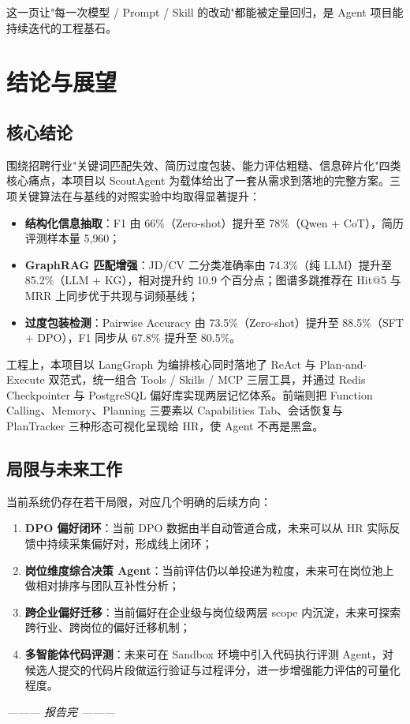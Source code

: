 \documentclass[12pt,a4paper]{ctexart}
\begin{document}
这一页让"每一次模型 / Prompt / Skill 的改动"都能被定量回归，是 Agent 项目能持续迭代的工程基石。

\section{结论与展望}\label{sec:conclusion}

\subsection{核心结论}

围绕招聘行业"关键词匹配失效、简历过度包装、能力评估粗糙、信息碎片化"四类核心痛点，本项目以 ScoutAgent 为载体给出了一套从需求到落地的完整方案。三项关键算法在与基线的对照实验中均取得显著提升：

\begin{itemize}[itemsep=2pt]
  \item \textbf{结构化信息抽取}：F1 由 66\%（Zero-shot）提升至 78\%（Qwen + CoT），简历评测样本量 5{,}960；
  \item \textbf{GraphRAG 匹配增强}：JD/CV 二分类准确率由 74.3\%（纯 LLM）提升至 85.2\%（LLM + KG），相对提升约 10.9 个百分点；图谱多跳推荐在 Hit@5 与 MRR 上同步优于共现与词频基线；
  \item \textbf{过度包装检测}：Pairwise Accuracy 由 73.5\%（Zero-shot）提升至 88.5\%（SFT + DPO），F1 同步从 67.8\% 提升至 80.5\%。
\end{itemize}

工程上，本项目以 LangGraph 为编排核心同时落地了 ReAct 与 Plan-and-Execute 双范式，统一组合 Tools / Skills / MCP 三层工具，并通过 Redis Checkpointer 与 PostgreSQL 偏好库实现两层记忆体系。前端则把 Function Calling、Memory、Planning 三要素以 Capabilities Tab、会话恢复与 PlanTracker 三种形态可视化呈现给 HR，使 Agent 不再是黑盒。

\subsection{局限与未来工作}

当前系统仍存在若干局限，对应几个明确的后续方向：

\begin{enumerate}[itemsep=3pt]
  \item \textbf{DPO 偏好闭环}：当前 DPO 数据由半自动管道合成，未来可以从 HR 实际反馈中持续采集偏好对，形成线上闭环；
  \item \textbf{岗位维度综合决策 Agent}：当前评估仍以单投递为粒度，未来可在岗位池上做相对排序与团队互补性分析；
  \item \textbf{跨企业偏好迁移}：当前偏好在企业级与岗位级两层 scope 内沉淀，未来可探索跨行业、跨岗位的偏好迁移机制；
  \item \textbf{多智能体代码评测}：未来可在 Sandbox 环境中引入代码执行评测 Agent，对候选人提交的代码片段做运行验证与过程评分，进一步增强能力评估的可量化程度。
\end{enumerate}

\vspace{1.2cm}
\begin{center}
\textit{——— 报告完 ———}
\end{center}
\end{document}
